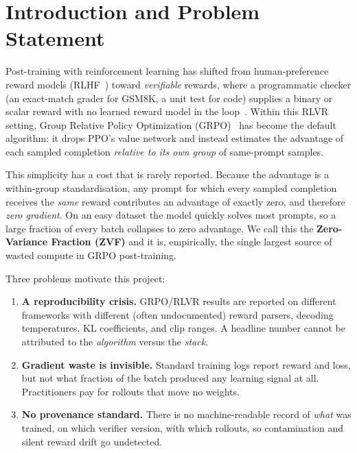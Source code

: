 \documentclass[12pt,a4paper]{report}
\begin{document}
\section{Introduction and Problem Statement}
\label{sec:intro}

Post-training with reinforcement learning has shifted from human-preference
reward models (RLHF~\cite{ouyang2022instructgpt}) toward \emph{verifiable}
rewards, where a programmatic checker (an exact-match grader for GSM8K, a unit
test for code) supplies a binary or scalar reward with no learned reward model in
the loop~\cite{lambert2024tulu3,guo2025r1}. Within this RLVR setting, Group
Relative Policy Optimization (GRPO)~\cite{shao2024deepseekmath} has become the
default algorithm: it drops PPO's value network and instead estimates the
advantage of each sampled completion \emph{relative to its own group} of
same-prompt samples.

This simplicity has a cost that is rarely reported. Because the advantage is a
within-group standardisation, any prompt for which every sampled completion
receives the \emph{same} reward contributes an advantage of exactly zero, and
therefore \emph{zero gradient}. On an easy dataset the model quickly solves most
prompts, so a large fraction of every batch collapses to zero advantage. We call
this the \textbf{Zero-Variance Fraction (ZVF)} and it is, empirically, the
single largest source of wasted compute in GRPO post-training.

Three problems motivate this project:

\begin{enumerate}[leftmargin=1.4em,itemsep=2pt]
  \item \textbf{A reproducibility crisis.} GRPO/RLVR results are reported on
  different frameworks with different (often undocumented) reward parsers,
  decoding temperatures, KL coefficients, and clip ranges. A headline number
  cannot be attributed to the \emph{algorithm} versus the \emph{stack}.
  \item \textbf{Gradient waste is invisible.} Standard training logs report reward
  and loss, but not what fraction of the batch produced any learning signal at
  all. Practitioners pay for rollouts that move no weights.
  \item \textbf{No provenance standard.} There is no machine-readable record of
  \emph{what} was trained, on which verifier version, with which rollouts, so
  contamination and silent reward drift go undetected.
\end{enumerate}
\end{document}

